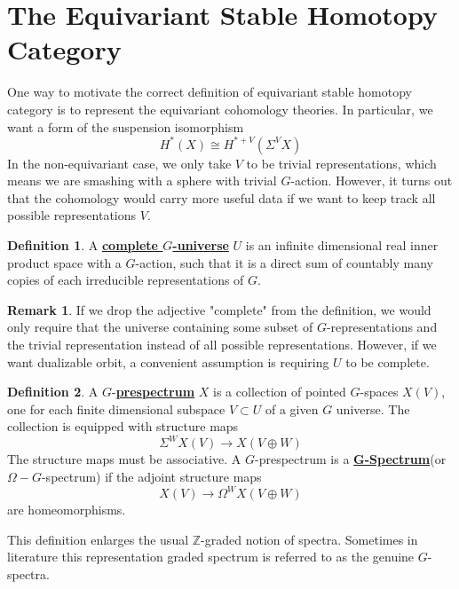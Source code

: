 \documentclass{article}
\theoremstyle{definition}
\theoremstyle{definition}
\newtheorem{definition}{Definition}[theorem]
\theoremstyle{definition}
\newtheorem{remark}{Remark}[theorem]
\theoremstyle{definition}
\theoremstyle{definition}
\theoremstyle{definition}
\theoremstyle{definition}
\begin{document}
\section{The Equivariant Stable Homotopy Category}
One way to motivate the correct definition of equivariant stable homotopy category is to represent the equivariant cohomology theories. In particular, we want a form of the suspension isomorphism
\[H^*(X)\cong H^{*+V}(\Sigma^VX)\]
In the non-equivariant case, we only take $V$ to be trivial representations, which means we are smashing with a sphere with trivial $G$-action. However, it turns out that the cohomology would carry more useful data if we want to keep track all possible representations $V$. 


\begin{tcolorbox}[colback=purple!5!white,colframe=purple!75!black]
\begin{definition}
A \underline{\textbf{complete $G$-universe}} $U$ is an infinite dimensional real inner product space with a $G$-action, such that it is a direct sum of countably many copies of each irreducible representations of $G$. 
\end{definition}
\end{tcolorbox}


\begin{tcolorbox}[colback=green!5!white,colframe=green!30!white]
\begin{remark}
If we drop the adjective "complete" from the definition, we would only require that the universe containing some subset of $G$-representations and the trivial representation instead of all possible representations. However, if we want dualizable orbit, a convenient assumption is requiring $U$ to be complete.  
\end{remark}
\end{tcolorbox}


\begin{tcolorbox}[colback=purple!5!white,colframe=purple!75!black]
\begin{definition}
A $G$-\underline{\textbf{prespectrum}} $X$ is a collection of pointed $G$-spaces $X(V)$, one for each finite dimensional subspace $V\subset U$ of a given $G$ universe. The collection is equipped with structure maps 
\[\Sigma^WX(V)\to X(V\oplus W)\]
The structure maps must be associative. A $G$-prespectrum is a \underline{\textbf{G-Spectrum}}(or $\Omega-G$-spectrum) if the adjoint structure maps 
\[X(V)\to \Omega^WX(V\oplus W)\] 
are homeomorphisms.
\end{definition}
\end{tcolorbox}
This definition enlarges the usual $\mathbb{Z}$-graded notion of spectra. Sometimes in literature this representation graded spectrum is referred to as the genuine $G$-spectra. 
\end{document}
